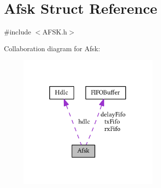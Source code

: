 \hypertarget{struct_afsk}{}\section{Afsk Struct Reference}
\label{struct_afsk}


{\ttfamily \#include $<$A\+F\+S\+K.\+h$>$}



Collaboration diagram for Afsk\+:
\nopagebreak
\begin{figure}[H]
\begin{center}
\leavevmode
\includegraphics[width=197pt]{struct_afsk__coll__graph}
\end{center}
\end{figure}
